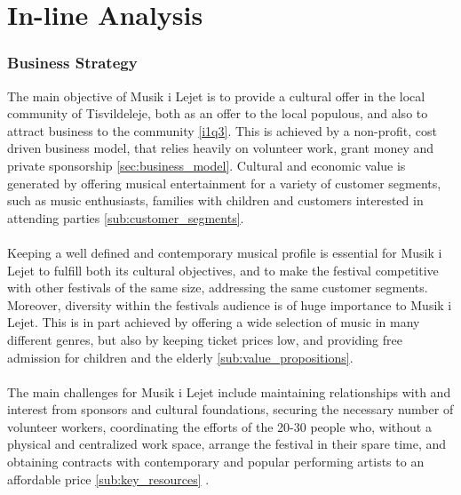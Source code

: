 \part{In-line Analysis}

\section{Business Strategy}
The main objective of Musik i Lejet is to provide a cultural offer in the local community of Tisvildeleje, both as an offer to the local populous, and also to attract business to the community \ref{i1q3}. This is achieved by a non-profit, cost driven business model, that relies heavily on volunteer work, grant money and private sponsorship \ref{sec:business_model}. Cultural and economic value is generated by offering musical entertainment for a variety of customer segments, such as music enthusiasts, families with children and customers interested in attending parties \ref{sub:customer_segments}.
\\ \\
Keeping a well defined and contemporary musical profile is essential for Musik i Lejet to fulfill both its cultural objectives, and to make the festival competitive with other festivals of the same size, addressing the same customer segments. Moreover, diversity within the festivals audience is of huge importance to Musik i Lejet. This is in part achieved by offering a wide selection of music in many different genres, but also by keeping ticket prices low, and providing free admission for children and the elderly \ref{sub:value_propositions}.
\\ \\
The main challenges for Musik i Lejet include maintaining relationships with and interest from sponsors and cultural foundations, securing the necessary number of volunteer workers, coordinating the efforts of the 20-30 people who, without a physical and centralized work space, arrange the festival in their spare time, and obtaining contracts with contemporary and popular performing artists to an affordable price \ref{sub:key_resources} .

